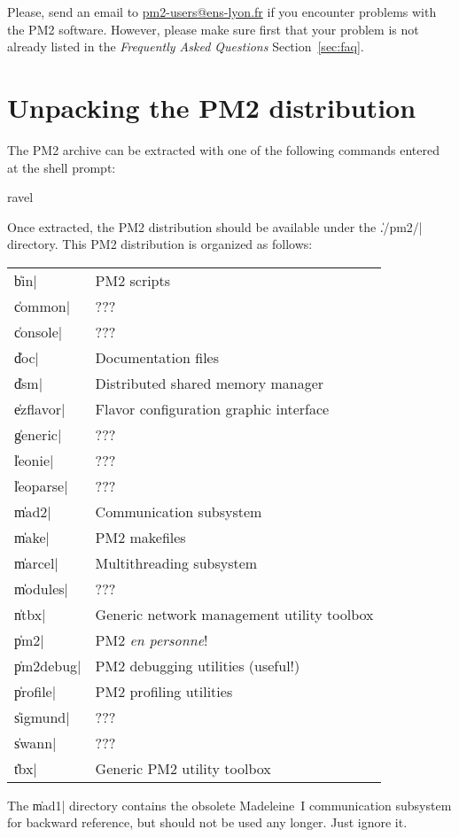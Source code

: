 Please, send an email to \url{pm2-users@ens-lyon.fr} if you encounter
problems with the PM2 software. However, please make sure first that
your problem is not already listed in the \emph{Frequently Asked
  Questions} Section~\ref{sec:faq}.

\section{Unpacking the PM2 distribution}

The PM2 archive can be extracted with one of the following commands
entered at the shell prompt:
\begin{shell}
ravel%
\end{shell}
Once extracted, the PM2 distribution should be available under the
\|./pm2/| directory. This PM2 distribution is organized as follows:
\begin{center}
\begin{tabular}{|l|l|}
\hline 
\|bin| &        PM2 scripts \\
\|common| &     ??? \\
\|console| &    ??? \\
\|doc| &        Documentation files \\
\|dsm| &        Distributed shared memory manager \\
\|ezflavor| &   Flavor configuration graphic interface \\
\|generic| &    ??? \\
\|leonie| &     ??? \\
\|leoparse| &   ??? \\
\|mad2| &       Communication subsystem \\
\|make| &       PM2 makefiles \\
\|marcel| &     Multithreading subsystem \\
\|modules| &    ??? \\
\|ntbx| &       Generic network management utility toolbox \\
\|pm2| &        PM2 \emph{en personne}! \\
\|pm2debug| &   PM2 debugging utilities (useful!) \\
\|profile| &    PM2 profiling utilities \\
\|sigmund| &    ??? \\
\|swann| &      ??? \\
\|tbx| &        Generic PM2 utility toolbox \\
\hline
\end{tabular}
\end{center}
The \|mad1| directory contains the obsolete Madeleine~I communication
subsystem for backward reference, but should not be used any
longer. Just ignore it.

